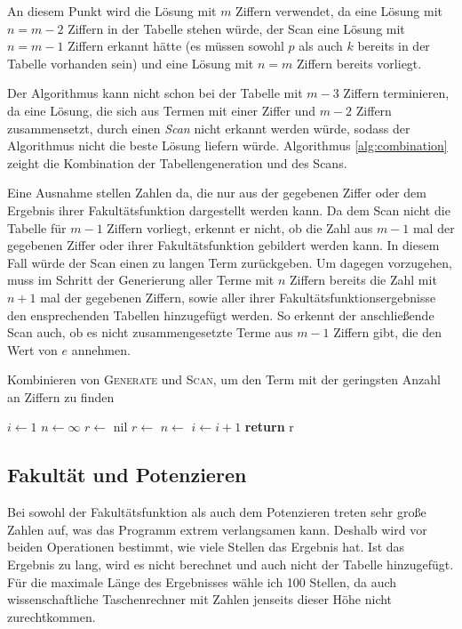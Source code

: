 \documentclass[a4paper,10pt,ngerman]{scrartcl}
\begin{document}
An diesem Punkt wird die Lösung mit $m$ Ziffern verwendet, da eine Lösung mit $n=m-2$ Ziffern in der Tabelle stehen würde, der Scan eine Lösung mit $n=m-1$ Ziffern erkannt hätte (es müssen sowohl $p$ als auch $k$ bereits in der Tabelle vorhanden sein) und eine Lösung mit $n=m$ Ziffern bereits vorliegt.

Der Algorithmus kann nicht schon bei der Tabelle mit $m-3$ Ziffern terminieren, da eine Lösung, die sich aus Termen mit einer Ziffer und $m-2$ Ziffern zusammensetzt, durch einen \textit{Scan} nicht erkannt werden würde, sodass der Algorithmus nicht die beste Lösung liefern würde.
Algorithmus \ref{alg:combination} zeight die Kombination der Tabellengeneration und des Scans.

Eine Ausnahme stellen Zahlen da, die nur aus der gegebenen Ziffer oder dem Ergebnis ihrer Fakultätsfunktion dargestellt werden kann.
Da dem Scan nicht die Tabelle für $m-1$ Ziffern vorliegt, erkennt er nicht, ob die Zahl aus $m-1$ mal der gegebenen Ziffer oder ihrer Fakultätsfunktion gebildert werden kann.
In diesem Fall würde der Scan einen zu langen Term zurückgeben.
Um dagegen vorzugehen, muss im Schritt der Generierung aller Terme mit $n$ Ziffern bereits die Zahl mit $n+1$ mal der gegebenen Ziffern, sowie aller ihrer Fakultätsfunktionsergebnisse den ensprechenden Tabellen hinzugefügt werden.
So erkennt der anschließende Scan auch, ob es nicht zusammengesetzte Terme aus $m-1$ Ziffern gibt, die den Wert von $e$ annehmen.


\begin{algorithm}
  \caption{Kombinieren von \textsc{Generate} und \textsc{Scan}, um den Term mit der geringsten Anzahl an Ziffern zu finden}
  \begin{algorithmic}[1]
    \State $i \gets 1$
    \State $n \gets \infty$
    \State $r \gets$ nil
        \State {}
        \State $r \gets$ 
          \State $n \gets$ 
        \EndIf
        \State $i \gets i+1$
    \EndWhile
    \State \textbf{return} r
  \end{algorithmic}
  \label{alg:combination}
\end{algorithm}

\subsection{Fakultät und Potenzieren}
Bei sowohl der Fakultätsfunktion als auch dem Potenzieren treten sehr große Zahlen auf, was das Programm extrem verlangsamen kann.
Deshalb wird vor beiden Operationen bestimmt, wie viele Stellen das Ergebnis hat.
Ist das Ergebnis zu lang, wird es nicht berechnet und auch nicht der Tabelle hinzugefügt.
Für die maximale Länge des Ergebnisses wähle ich 100 Stellen, da auch wissenschaftliche Taschenrechner mit Zahlen jenseits dieser Höhe nicht zurechtkommen.
\end{document}
